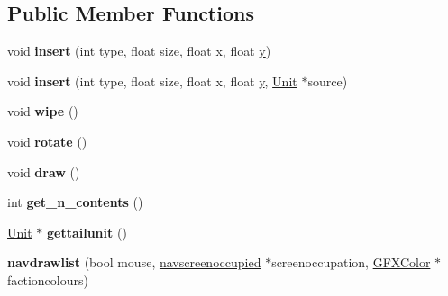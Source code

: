 \subsection*{Public Member Functions}
\begin{DoxyCompactItemize}
\item 
void {\bfseries insert} (int type, float size, float x, float \hyperlink{IceUtils_8h_aa7ffaed69623192258fb8679569ff9ba}{y})\hypertarget{classnavdrawlist_a26682fb9b9bd547786a1c3d2d1b6b643}{}\label{classnavdrawlist_a26682fb9b9bd547786a1c3d2d1b6b643}

\item 
void {\bfseries insert} (int type, float size, float x, float \hyperlink{IceUtils_8h_aa7ffaed69623192258fb8679569ff9ba}{y}, \hyperlink{classUnit}{Unit} $\ast$source)\hypertarget{classnavdrawlist_a4f11d4acc9e832566b14f700b14abf47}{}\label{classnavdrawlist_a4f11d4acc9e832566b14f700b14abf47}

\item 
void {\bfseries wipe} ()\hypertarget{classnavdrawlist_a8be4196249df07d5b1a80cf945f8e9b2}{}\label{classnavdrawlist_a8be4196249df07d5b1a80cf945f8e9b2}

\item 
void {\bfseries rotate} ()\hypertarget{classnavdrawlist_a79f0d9641c4cd1e04af7a341035ce1e1}{}\label{classnavdrawlist_a79f0d9641c4cd1e04af7a341035ce1e1}

\item 
void {\bfseries draw} ()\hypertarget{classnavdrawlist_aac2882d04c3ef1f469104ad000d78dfc}{}\label{classnavdrawlist_aac2882d04c3ef1f469104ad000d78dfc}

\item 
int {\bfseries get\+\_\+n\+\_\+contents} ()\hypertarget{classnavdrawlist_aa165ab4eecc03c26619343bd6415735e}{}\label{classnavdrawlist_aa165ab4eecc03c26619343bd6415735e}

\item 
\hyperlink{classUnit}{Unit} $\ast$ {\bfseries gettailunit} ()\hypertarget{classnavdrawlist_a6fec4ce31e77710378692c9d680d0b96}{}\label{classnavdrawlist_a6fec4ce31e77710378692c9d680d0b96}

\item 
{\bfseries navdrawlist} (bool mouse, \hyperlink{classnavscreenoccupied}{navscreenoccupied} $\ast$screenoccupation, \hyperlink{structGFXColor}{G\+F\+X\+Color} $\ast$factioncolours)\hypertarget{classnavdrawlist_a5980a54d52641b6c10e35d797fb8374b}{}\label{classnavdrawlist_a5980a54d52641b6c10e35d797fb8374b}

\end{DoxyCompactItemize}
